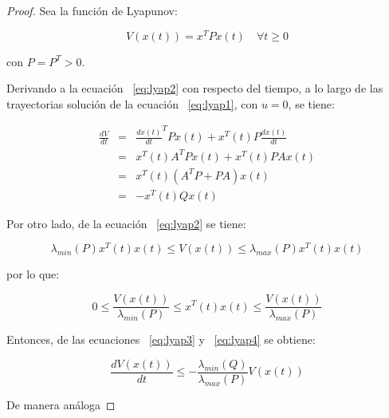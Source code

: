         \begin{proof}
            Sea la función de Lyapunov:

            \begin{equation} \label{eq:lyap2}
                V(x(t)) = x^T P x(t) \quad \forall t \ge 0
            \end{equation}

            con $P = P^T > 0$.

            Derivando a la ecuación ~\ref{eq:lyap2} con respecto del tiempo, a lo largo de las trayectorias solución de la ecuación ~\ref{eq:lyap1}, con $u = 0$, se tiene:

            \begin{eqnarray} \label{eq:lyap3}
                \frac{dV}{dt} & = & \frac{dx(t)}{dt}^T P x(t) + x^T(t) P \frac{dx(t)}{dt} \nonumber \\
                & = & x^T(t) A^T P x(t) + x^T(t) P A x(t) \nonumber \\
                & = & x^T(t) \left( A^T P + P A \right) x(t) \nonumber \\
                & = & -x^T(t) Q x(t)
            \end{eqnarray}

            Por otro lado, de la ecuación ~\ref{eq:lyap2} se tiene:

            \begin{equation*}
                \lambda_{min}(P) x^T(t) x(t) \le V(x(t)) \le \lambda_{max}(P) x^T(t) x(t)
            \end{equation*}

            por lo que:

            \begin{equation} \label{eq:lyap4}
                0 \le \frac{V(x(t))}{\lambda_{min}(P)} \le x^T(t) x(t) \le \frac{V(x(t))}{\lambda_{max}(P)}
            \end{equation}

            Entonces, de las ecuaciones ~\ref{eq:lyap3} y ~\ref{eq:lyap4} se obtiene:

            \begin{equation} \label{eq:lyap5}
                \frac{dV(x(t))}{dt} \le - \frac{\lambda_{min}(Q)}{\lambda_{max}(P)} V(x(t))
            \end{equation}

            De manera análoga


\end{proof}
